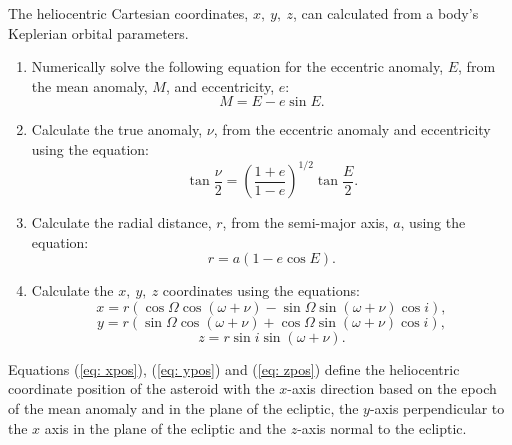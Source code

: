 \documentclass[10pt, twocolumn]{revtex4}    %
\begin{document}
\vspace{1ex}
The heliocentric Cartesian coordinates, $x,\ y,\ z$, can calculated from a body's Keplerian orbital parameters.
\begin{enumerate}
\item Numerically solve the following equation for the eccentric anomaly, $E$, from the mean anomaly, $M$, and eccentricity, $e$:
\begin{equation}
M = E - e \sin E .
\end{equation}
\item Calculate the true anomaly, $\nu$, from the eccentric anomaly and eccentricity using the equation:
\begin{equation}
\tan \frac{\nu}{2} = \left(\frac{1+e}{1-e} \right)^{1/2} \tan \frac{E}{2} .
\end{equation}
\item Calculate the radial distance, $r$, from the semi-major axis, $a$, using the equation:
\begin{equation}
r = a(1-e\cos E) .
\end{equation}
\item Calculate the $x,\ y,\ z$ coordinates using the equations:
\begin{equation} \label{eq: xpos}
x = r(\cos\Omega\cos(\omega+\nu) - \sin\Omega\sin(\omega+\nu)\cos i) ,
\end{equation}
\begin{equation} \label{eq: ypos}
y = r(\sin\Omega\cos(\omega+\nu) + \cos\Omega\sin(\omega+\nu)\cos i) ,
\end{equation}
\begin{equation} \label{eq: zpos}
z = r\sin i \sin(\omega+\nu) .
\end{equation}
\end{enumerate}
Equations (\ref{eq: xpos}), (\ref{eq: ypos}) and (\ref{eq: zpos}) define the heliocentric coordinate position of the asteroid with the $x$-axis direction based on the epoch of the mean anomaly and in the plane of the ecliptic, the $y$-axis perpendicular to the $x$ axis in the plane of the ecliptic and the $z$-axis normal to the ecliptic.
\vspace{1ex}
\end{document}
